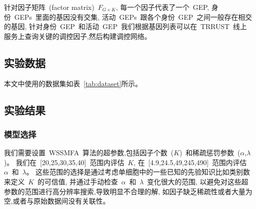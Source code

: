 针对因子矩阵~(factor matrix)~$F_{G \times K}$, 每一个因子代表了一个~GEP, 
身份~GEPs~里面的基因没有交集, 活动~GEPs~跟各个身份~GEP~之间一般存在相交的基因, 
针对身份~GEP~和活动~GEP~我们根据基因列表可以在~TRRUST~线上服务上查询关键的调控因子,然后构建调控网络。

\subsection{实验数据}
本文中使用的数据集如表~\ref{tab:dataset}所示。
\begin{table}[!htbp]
    \caption{\label{tab:dataset}The published dataset we used} 
\end{table}

\subsection{实验结果}
\subsubsection{模型选择}
我们需要设置~WSSMFA~算法的超参数,包括因子个数~($K$)~和稀疏惩罚参数~($\alpha$,$\lambda$)。
我们在~[20,25,30,35,40]~范围内评估~$K$, 在~[4.9,24.5,49,245,490]~范围内评估~$\alpha$~和~$\lambda$。
这些范围的选择是通过考虑单细胞中的一些已知的先验知识比如类别数来定义~$K$~的可信值,
并通过手动检查~$\alpha$~和~$\lambda$~变化很大的范围,
以避免对这些超参数的范围进行高分辨率搜索,导致明显不合理的解,
如因子缺乏稀疏性或者大量为空,或者与原始数据间没有关联性。

